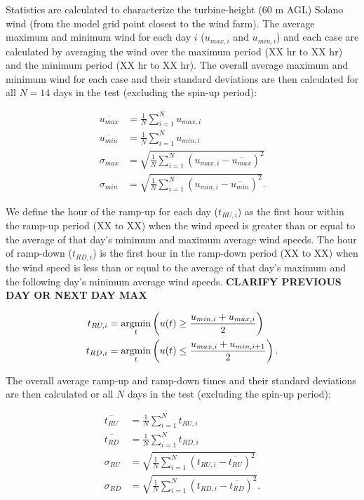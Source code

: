 Statistics are calculated to characterize the turbine-height (60 m AGL) Solano wind (from the model grid point closest to the wind farm).  The average maximum and minimum wind for each day $i$ ($u_{max, i}$ and $u_{min, i}$) and each case are calculated by averaging the wind over the maximum period (XX hr to XX hr) and the minimum period (XX hr to XX hr).  The overall average maximum and minimum wind for each case and their standard deviations are then calculated for all $N=14$ days in the test (excluding the spin-up period):

\begin{align}
	\overline{u_{max}} &= \frac{1}{N} \sum\limits_{i=1}^N u_{max, i} \\
	\overline{u_{min}} &= \frac{1}{N} \sum\limits_{i=1}^N u_{min, i} \\
	\sigma_{max} &= \sqrt{ \frac{1}{N} \sum\limits_{i=1}^N (u_{max, i}-\overline{u_{max}})^2 } \\ 
	\sigma_{min} &= \sqrt{ \frac{1}{N} \sum\limits_{i=1}^N (u_{min, i}-\overline{u_{min}})^2 }.
\end{align}

We define the hour of the ramp-up for each day ($t_{RU, i}$) as the first hour within the ramp-up period (XX to XX) when the wind speed is greater than or equal to the average of that day's minimum and maximum average wind speeds.  The hour of ramp-down ($t_{RD, i}$) is the first hour in the ramp-down period (XX to XX) when the wind speed is less than or equal to the average of that day's maximum and the following day's minimum average wind speeds.  \textbf{CLARIFY PREVIOUS DAY OR NEXT DAY MAX}

\begin{align}
	t_{RU, i} &= \operatorname*{argmin} \limits_{t} \left(u(t) \ge \frac{u_{min, i}+u_{max, i}}{2} \right) \\
	t_{RD, i} &= \operatorname*{argmin} \limits_{t} \left(u(t) \le \frac{u_{max, i}+u_{min, i+1}}{2} \right).
\end{align}

The overall average ramp-up and ramp-down times and their standard deviations are then calculated or all $N$ days in the test (excluding the spin-up period):

\begin{align}
	\overline{t_{RU}} &= \frac{1}{N} \sum\limits_{i=1}^N t_{RU, i} \\
	\overline{t_{RD}} &= \frac{1}{N} \sum\limits_{i=1}^N t_{RD, i} \\
	\sigma_{RU} &= \sqrt{ \frac{1}{N} \sum\limits_{i=1}^N (t_{RU, i}-\overline{t_{RU}})^2 } \\ 
	\sigma_{RD} &= \sqrt{ \frac{1}{N} \sum\limits_{i=1}^N (t_{RD, i}-\overline{t_{RD}})^2 }.
\end{align}


